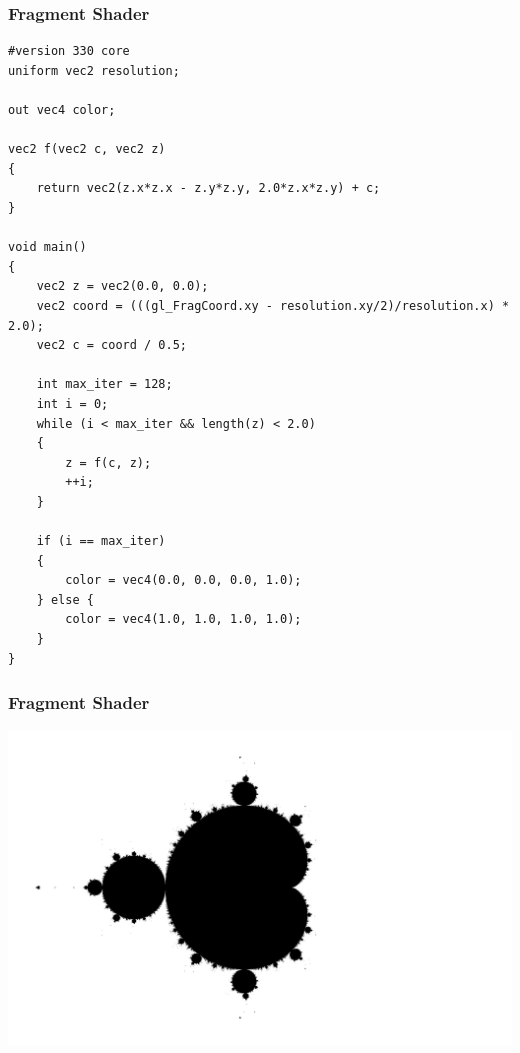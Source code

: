 \documentclass{beamer}
\begin{document}
\begin{frame}[fragile]
\frametitle{Fragment Shader}

\begin{verbatim}
#version 330 core
uniform vec2 resolution;

out vec4 color;

vec2 f(vec2 c, vec2 z)
{
    return vec2(z.x*z.x - z.y*z.y, 2.0*z.x*z.y) + c;
}

void main()
{
    vec2 z = vec2(0.0, 0.0);
    vec2 coord = (((gl_FragCoord.xy - resolution.xy/2)/resolution.x) * 2.0);
    vec2 c = coord / 0.5;

    int max_iter = 128;
    int i = 0;
    while (i < max_iter && length(z) < 2.0)
    {
        z = f(c, z);
        ++i;
    }

    if (i == max_iter)
    {
        color = vec4(0.0, 0.0, 0.0, 1.0);
    } else {
        color = vec4(1.0, 1.0, 1.0, 1.0);
    }
}

\end{verbatim}

\end{frame}


\begin{frame}
\frametitle{Fragment Shader}
\centering
\includegraphics[width=1.0\textwidth]{GreyscaleMandelbrot.png}
\end{frame}
\end{document}
